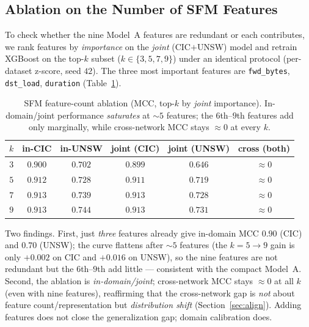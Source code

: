 \documentclass[preprint,12pt,authoryear]{elsarticle}
\begin{document}
\subsection{Ablation on the Number of SFM Features}
\label{sec:ablation}
To check whether the nine Model~A features are redundant or each contributes, we
rank features by \emph{importance} on the \emph{joint} (CIC$+$UNSW) model and
retrain XGBoost on the top-$k$ subset ($k\in\{3,5,7,9\}$) under an identical
protocol (per-dataset z-score, seed $42$). The three most important features are
\texttt{fwd\_bytes}, \texttt{dst\_load}, \texttt{duration}
(Table~\ref{tab:ablation}).

\begin{table}[h]
\centering
\caption{SFM feature-count ablation (MCC, top-$k$ by \emph{joint} importance).
In-domain/joint performance \emph{saturates} at $\sim$$5$ features; the $6$th--$9$th
features add only marginally, while cross-network MCC stays $\approx 0$ at every $k$.}
\label{tab:ablation}
\begin{tabular}{cccccc}
\toprule
$k$ & in-CIC & in-UNSW & joint (CIC) & joint (UNSW) & cross (both) \\
\midrule
$3$ & $0.900$ & $0.702$ & $0.899$ & $0.646$ & $\approx 0$ \\
$5$ & $0.912$ & $0.728$ & $0.911$ & $0.719$ & $\approx 0$ \\
$7$ & $0.913$ & $0.739$ & $0.913$ & $0.728$ & $\approx 0$ \\
$9$ & $0.913$ & $0.744$ & $0.913$ & $0.731$ & $\approx 0$ \\
\bottomrule
\end{tabular}
\end{table}

Two findings. First, just \emph{three} features already give in-domain MCC $0.90$
(CIC) and $0.70$ (UNSW); the curve flattens after $\sim$$5$ features (the
$k{=}5\!\to\!9$ gain is only $+0.002$ on CIC and $+0.016$ on UNSW), so the nine
features are not redundant but the $6$th--$9$th add little --- consistent with the
compact Model~A. Second, the ablation is \emph{in-domain/joint}; cross-network MCC
stays $\approx 0$ at all $k$ (even with nine features), reaffirming that the
cross-network gap is \emph{not} about feature count/representation but
\emph{distribution shift} (Section~\ref{sec:align}). Adding features does not close
the generalization gap; domain calibration does.

\end{document}
